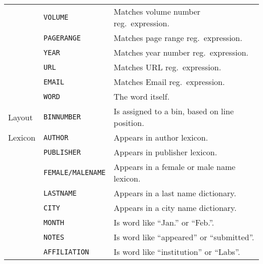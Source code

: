{\begin{minipage}[c]{\linewidth}
\begin{tabular}{l l l}
          & \texttt{VOLUME}           & Matches volume number reg.\ expression.\\
          & \texttt{PAGERANGE}        & Matches page range reg.\ expression.\\
          & \texttt{YEAR}             & Matches year number reg.\ expression.\\
          & \texttt{URL}              & Matches URL reg.\ expression.\\
          & \texttt{EMAIL}            & Matches Email reg.\ expression.\\
          & \texttt{WORD}             & The word itself.\\
  \midrule
  Layout  & \texttt{BINNUMBER}        & Is assigned to a bin, based on line position.\\
  \midrule
  Lexicon & \texttt{AUTHOR}           & Appears in author lexicon.\\
          & \texttt{PUBLISHER}        & Appears in publisher lexicon.\\
          & \texttt{FEMALE/MALENAME}  & Appears in a female or male name lexicon.\\
          & \texttt{LASTNAME}         & Appears in a last name dictionary.\\
          & \texttt{CITY}             & Appears in a city name dictionary.\\
          & \texttt{MONTH}            & Is word like ``Jan.'' or ``Feb.''.\\
          & \texttt{NOTES}            & Is word like ``appeared'' or ``submitted''.\\
          & \texttt{AFFILIATION}      & Is word like ``institution'' or ``Labs''.\\
  \bottomrule
\end{tabular}
\label{tab:feature-descriptions}
\end{minipage}
}

